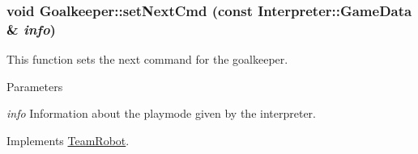 \hypertarget{classGoalkeeper_abc394351f7c0d552c6e96da422c772ec}{
\subsubsection[{setNextCmd}]{\setlength{\rightskip}{0pt plus 5cm}void Goalkeeper::setNextCmd (const {\bf Interpreter::GameData} \& {\em info})}}
\label{classGoalkeeper_abc394351f7c0d552c6e96da422c772ec}


This function sets the next command for the goalkeeper. 


\begin{DoxyParams}{Parameters}
\item[{\em info}]Information about the playmode given by the interpreter. \end{DoxyParams}


Implements \hyperlink{classTeamRobot_a65f9a2b7464dfac3f4a0336810cf574f}{TeamRobot}.



